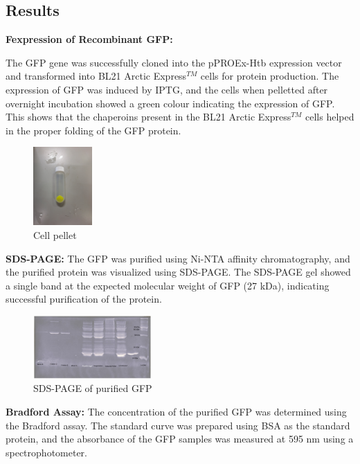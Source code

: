 \documentclass[twoside]{article}
\begin{document}
\begin{multicols}{2}
\subsection*{Results}

\textbf{Fexpression of Recombinant GFP:}

The GFP gene was successfully cloned into the pPROEx-Htb expression vector and transformed into BL21 Arctic Express$^{TM}$ cells for protein production.
The expression of GFP was induced by IPTG, and the cells when pelletted after overnight incubation
showed a green colour indicating the expression of GFP. This shows that the chaperoins present in the BL21 Arctic Express$^{TM}$ cells helped in the proper folding of the GFP protein.


\begin{figure}[H]
    \centering
    \includegraphics[angle=270,width=0.2\textwidth]{Cell pellet.jpg}
    \caption{Cell pellet}
    \label{fig:Cell_Lysis}
\end{figure}

\textbf{SDS-PAGE:}
The GFP was purified using Ni-NTA affinity chromatography, and the purified protein was visualized using SDS-PAGE.
The SDS-PAGE gel showed a single band at the expected molecular weight of GFP (27 kDa), indicating successful purification of the protein.


\begin{figure}[H]
    \centering
    \includegraphics[width=0.4\textwidth]{SDSPAGEgel.jpg}
    \caption{SDS-PAGE of purified GFP}
    \label{fig:SDS-PAGE GEL}
\end{figure}

\textbf{Bradford Assay:}
The concentration of the purified GFP was determined using the Bradford assay. 
The standard curve was prepared using BSA as the standard protein,
and the absorbance of the GFP samples was measured at 595 nm using a spectrophotometer.


\end{multicols}
\end{document}
